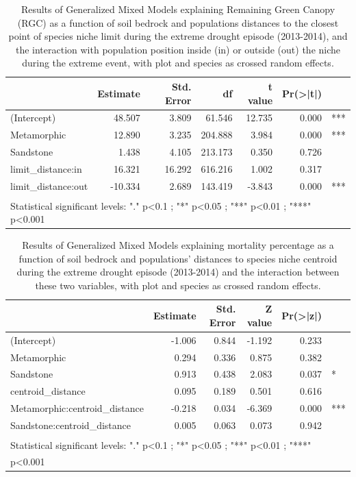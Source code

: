 \documentclass[11pt,twoside]{reedthesis}
\begin{document}
\begin{table}[H]

\caption[Model result of Remaining Green Canopy (RGC) as a function of soil bedrock and populations’ distances to the closest point of species niche limit]{\label{tab:unnamed-chunk-6}Results of Generalized Mixed Models explaining Remaining Green Canopy (RGC) as a function of soil bedrock and populations distances to the closest point of species niche limit during the extreme drought episode (2013-2014), and the interaction with population position inside (in) or outside (out) the niche during the extreme event, with plot and species as crossed random effects.}
\centering
\fontsize{8}{10}\selectfont
\begin{tabular}[t]{lrrrrrl}
\toprule
 & Estimate & Std. Error & df & t value & Pr(>|t|) & \\
\midrule
(Intercept) & 48.507 & 3.809 & 61.546 & 12.735 & 0.000 & ***\\
Metamorphic & 12.890 & 3.235 & 204.888 & 3.984 & 0.000 & ***\\
Sandstone & 1.438 & 4.105 & 213.173 & 0.350 & 0.726 & \\
limit\_distance:in & 16.321 & 16.292 & 616.216 & 1.002 & 0.317 & \\
limit\_distance:out & -10.334 & 2.689 & 143.419 & -3.843 & 0.000 & ***\\
\bottomrule
\multicolumn{7}{l}{\textsuperscript{} Statistical significant levels: "." p<0.1 ; "*" p<0.05 ; "**" p<0.01 ; "***" p<0.001}\\
\end{tabular}
\end{table}
\begin{table}[H]

\caption[Model result of mortality percentage as a function of soil bedrock and populations’ distances to species niche centroid]{\label{tab:unnamed-chunk-7}Results of Generalized Mixed Models explaining mortality percentage as a function of soil bedrock and populations’ distances to species niche centroid during the extreme drought episode (2013-2014) and the interaction between these two variables, with plot and species as crossed random effects.}
\centering
\fontsize{8}{10}\selectfont
\begin{tabular}[t]{lrrrrl}
\toprule
 & Estimate & Std. Error & Z value & Pr(>|z|) & \\
\midrule
(Intercept) & -1.006 & 0.844 & -1.192 & 0.233 & \\
Metamorphic & 0.294 & 0.336 & 0.875 & 0.382 & \\
Sandstone & 0.913 & 0.438 & 2.083 & 0.037 & *\\
centroid\_distance & 0.095 & 0.189 & 0.501 & 0.616 & \\
Metamorphic:centroid\_distance & -0.218 & 0.034 & -6.369 & 0.000 & ***\\
Sandstone:centroid\_distance & 0.005 & 0.063 & 0.073 & 0.942 & \\
\bottomrule
\multicolumn{6}{l}{\textsuperscript{} Statistical significant levels: "." p<0.1 ; "*" p<0.05 ; "**" p<0.01 ; "***"}\\
\multicolumn{6}{l}{p<0.001}\\
\end{tabular}
\end{table}
\end{document}
